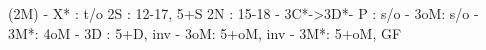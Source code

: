 (2M) - 
X* : t/o
2S : 12-17, 5+S
2N : 15-18
   - 3C*->3D*- P  : s/o
             - 3oM: s/o
             - 3M*: 4oM
   - 3D : 5+D, inv
   - 3oM: 5+oM, inv
   - 3M*: 5+oM, GF

